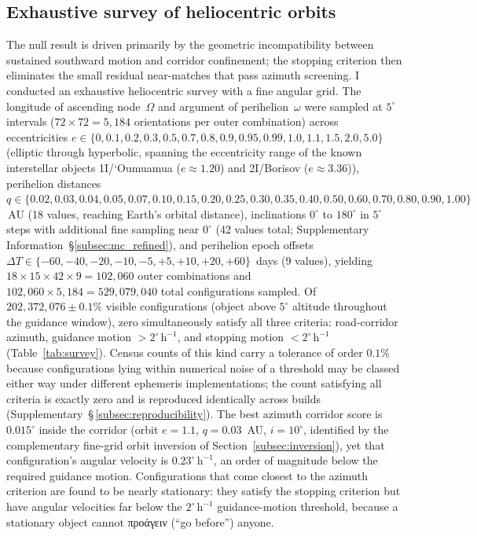 \documentclass[sn-nature]{sn-jnl}
\newcommand{\grk}[1]{{\fontencoding{LGR}\selectfont #1}}
\newcommand{\grk}[1]{{\greekfont #1}}
\begin{document}
\subsection{Exhaustive survey of heliocentric orbits}
\label{subsec:helio}

The null result is driven primarily by the geometric incompatibility between
sustained southward motion and corridor confinement; the stopping criterion
then eliminates the small residual near-matches that pass azimuth screening.
I conducted an exhaustive heliocentric survey with a fine angular grid.
The longitude of ascending node~$\Omega$ and argument of perihelion~$\omega$
were sampled at $5^\circ$ intervals ($72 \times 72 = 5{,}184$ orientations
per outer combination) across eccentricities
$e \in \{0, 0.1, 0.2, 0.3, 0.5, 0.7, 0.8, 0.9, 0.95, 0.99, 1.0, 1.1,
1.5, 2.0, 5.0\}$ (elliptic through hyperbolic, spanning the eccentricity
range of the known interstellar objects
1I/\textquoteleft{}Oumuamua ($e \approx 1.20$)\cite{meech2017} and
2I/Borisov ($e \approx 3.36$)\cite{guzik2020}), perihelion distances
$q \in \{0.02, 0.03, 0.04, 0.05, 0.07, 0.10, 0.15, 0.20, 0.25, 0.30,\allowbreak
0.35, 0.40, 0.50, 0.60, 0.70, 0.80, 0.90, 1.00\}$\,AU (18 values,
reaching Earth's orbital distance), inclinations $0^\circ$ to $180^\circ$
in $5^\circ$ steps with additional fine sampling near $0^\circ$
(42 values total; Supplementary Information~\S\ref{subsec:mc_refined}), and perihelion epoch offsets
$\Delta T \in \{-60, -40, -20, -10, -5, +5, +10, +20, +60\}$~days (9
values), yielding $18 \times 15 \times 42 \times 9 = 102{,}060$ outer
combinations and $102{,}060 \times 5{,}184 = 529{,}079{,}040$ total
configurations sampled. Of $202{,}372{,}076 \pm 0.1\%$ visible configurations
(object above $5^\circ$ altitude throughout the guidance window), zero
simultaneously satisfy all three criteria: road-corridor azimuth,
guidance motion $> 2^\circ\,\mathrm{h}^{-1}$, and stopping motion
$< 2^\circ\,\mathrm{h}^{-1}$ (Table~\ref{tab:survey}).
Census counts of this kind carry a tolerance of order $0.1\%$ because
configurations lying within numerical noise of a threshold may be classed
either way under different ephemeris implementations; the count satisfying
all criteria is exactly zero and is reproduced identically across builds
(Supplementary~\S\,\ref{subsec:reproducibility}).
The best azimuth corridor score is $0.015^\circ$ inside the corridor
(orbit $e=1.1$, $q=0.03$~AU, $i=10^\circ$, identified by the
complementary fine-grid orbit inversion of Section~\ref{subsec:inversion}),
yet that configuration's angular velocity is $0.23^\circ\,\mathrm{h}^{-1}$, an
order of magnitude below the required guidance motion. Configurations that come closest to
the azimuth criterion are found to be nearly stationary: they satisfy the stopping
criterion but have angular velocities far below the
$2^\circ\,\mathrm{h}^{-1}$ guidance-motion threshold, because a
stationary object cannot \grk{προάγειν} (``go before'') anyone.
\end{document}
